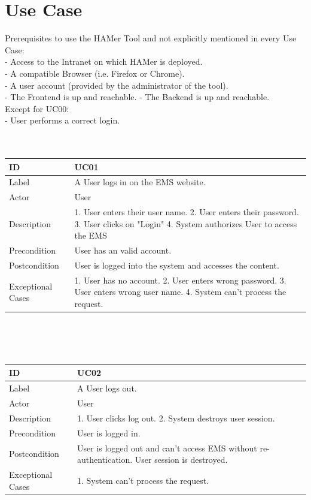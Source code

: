 \documentclass{scrreprt}
\begin{document}
\section{Use Case}
Prerequisites to use the HAMer Tool and not explicitly mentioned in every Use Case: \\
- Access to the Intranet on which HAMer is deployed.\\
- A compatible Browser (i.e. Firefox or Chrome). \\
- A user account (provided by the administrator of the tool). \\
- The Frontend is up and reachable.
- The Backend is up and reachable. \\
 Except for UC00: \\
- User performs a correct login.
\\
\\ \\
\begin{tabularx}{12cm}{l|X}
	ID & UC01  \\
	\hline
	Label & 
	A User logs in on the EMS website. \\
	\hline
	Actor            & User    \\
	\hline
	Description            &  	1. User enters their user name. 2. User enters their password. 3. User clicks on "Login" 4. System authorizes User to access the EMS \\
	\hline
	Precondition           &   User has an valid account.\\ 
	\hline
	Postcondition     & User is logged into the system and accesses the content. \\
	\hline
	Exceptional Cases & 1. User has no account. 2. User enters wrong password. 3. User enters wrong user name. 
	4. System can't process the request.
	
\end{tabularx}
\\
\\ \\
\begin{tabularx}{12cm}{l|X}
	ID & UC02  \\
	\hline
	Label & 
	A User logs out. \\
	\hline
	Actor            & User   \\
	\hline
	Description            &  	1. User clicks log out. 2. System destroys user session.  \\
	\hline
	Precondition           &   User is logged in.\\ 
	\hline
	Postcondition     & User is logged out and can't access EMS without re-authentication. User session is destroyed. \\
	\hline
	Exceptional Cases & 1. System can't process the request.
	
\end{tabularx}
\end{document}
